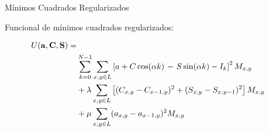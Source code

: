\documentclass[]{beamer}
\begin{document}
\begin{frame}{M\'inimos Cuadrados Regularizados}

Funcional de m\'inimos cuadrados regularizados:
\begin{center}
\begin{small}
\begin{align}
  U(\bf{a,C,S})=\nonumber\\
  &\sum_{k=0}^{N-1} \sum_{x,y\in L} \left[a + 
  C\cos(\alpha k)\right.
  -\left. S\sin(\alpha k)-I_k \right]^2 M_{x,y}\nonumber \\
  &+\lambda\sum_{x,y\in L}
  \left[(C_{x,y}-C_{x-1,y})^2+(S_{x,y}-S_{x,y-1})^2\right]M_{x,y}
  \nonumber\\
  &+\mu\sum_{x,y\in L}(a_{x,y}-a_{x-1,y})^2 M_{x,y}
  \label{eq:psi regularized}
\end{align}
\end{small}


\end{center}
\end{frame}
\end{document}
